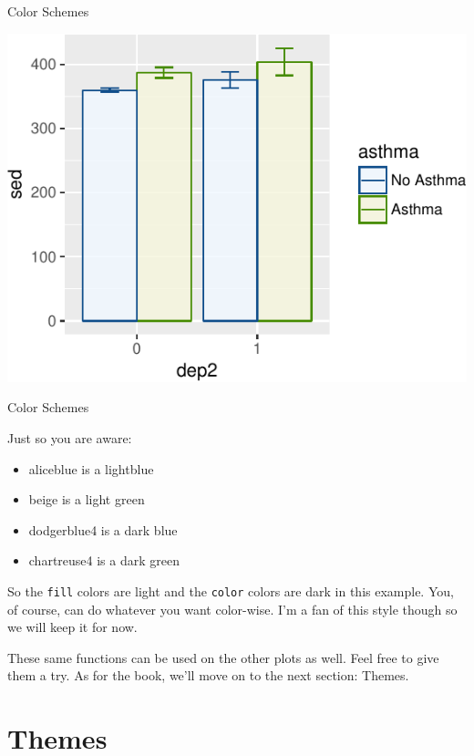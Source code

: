 \begin{frame}{Color Schemes}

\includegraphics{09_AdvancedPlotting_files/figure-beamer/cs1-1.pdf}

\end{frame}

\begin{frame}[fragile]{Color Schemes}

Just so you are aware:

\begin{itemize}
\tightlist
\item
  aliceblue is a lightblue
\item
  beige is a light green
\item
  dodgerblue4 is a dark blue
\item
  chartreuse4 is a dark green
\end{itemize}

So the \texttt{fill} colors are light and the \texttt{color} colors are
dark in this example. You, of course, can do whatever you want
color-wise. I'm a fan of this style though so we will keep it for now.

These same functions can be used on the other plots as well. Feel free
to give them a try. As for the book, we'll move on to the next section:
Themes.

\end{frame}

\section{Themes}\label{themes}

